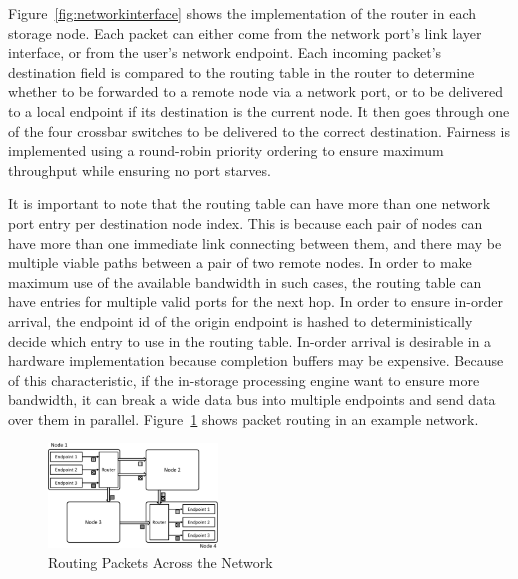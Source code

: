 Figure~\ref{fig:networkinterface} shows the implementation of the router in each
storage node. Each packet can either come from the network port's link layer
interface, or from the user's network endpoint. Each incoming packet's
destination field is compared to the routing table in the router to determine
whether to be forwarded to a remote node via a network port, or to be delivered
to a local endpoint if its destination is the current node. It then goes through
one of the four crossbar switches to be delivered to the correct destination. 
Fairness is implemented using a round-robin priority ordering to ensure maximum
throughput while ensuring no port starves.

It is important to note that the routing table can have more than one network
port entry per destination node index. This is because each pair of nodes can
have more than one immediate link connecting between them, and there may be
multiple viable paths between a pair of two remote nodes. In order to make
maximum use of the available bandwidth in such cases, the routing table can have
entries for multiple valid ports for the next hop. In order to ensure in-order
arrival, the endpoint id of the origin endpoint is hashed to deterministically
decide which entry to use in the routing table. In-order arrival is desirable in
a hardware implementation because completion buffers may be expensive.
Because of this characteristic, if the in-storage processing engine want to
ensure more bandwidth, it can break a wide data bus into multiple endpoints and
send data over them in parallel. Figure~\ref{fig:networkrouting} shows packet
routing in an example network.

\begin{figure}[h]
	\begin{center}
	\includegraphics[width=0.4\textwidth]{figures/routing-crop.pdf}
	\caption{Routing Packets Across the Network}
	\label{fig:networkrouting}
	\end{center}
\end{figure}

